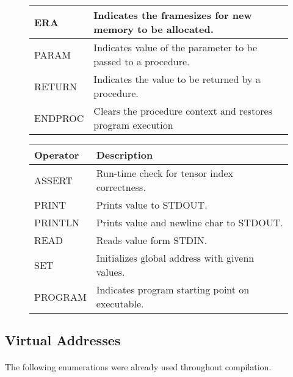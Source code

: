 \begin{figure}[h]
\begin{tabular}{p{1in}p{3in}}
        \midrule ERA &
        Indicates the framesizes for new memory to be \newline allocated.\\

        \midrule PARAM &
        Indicates value of the parameter to be passed to a procedure.\\

        \midrule RETURN &
        Indicates the value to be returned by a procedure.\\

        \midrule ENDPROC &
        Clears the procedure context and restores program execution\\

        \bottomrule
    \end{tabular}
\end{figure}

\begin{figure}[h]
    \centering
    \begin{tabular}{p{1in}p{3in}}
        \toprule
        \textbf{Operator} & \textbf{Description}\\
        \midrule ASSERT &
        Run-time check for tensor index correctness.\\

        \midrule PRINT &
        Prints value to STDOUT.\\

        \midrule PRINTLN &
        Prints value and newline char to STDOUT.\\

        \midrule READ &
	Reads value form STDIN.\\

        \midrule SET &
        Initializes global address with givenn values.\\

        \midrule PROGRAM &
        Indicates program starting point on executable.\\

        \bottomrule
    \end{tabular}
\end{figure}

\subsection{Virtual Addresses}

\paragraph{} The following enumerations were already used throughout
compilation.

